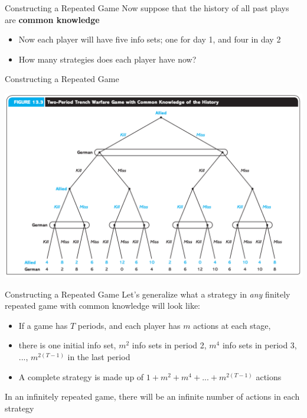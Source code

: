 \begin{frame}{Constructing a Repeated Game}
  Now suppose that the history of all past plays are \textbf{common knowledge} 
  \begin{itemize}
    \item Now each player will have five info sets; one for day 1, and four in day 2 
    \item How many strategies does each player have now?
  \end{itemize}
\end{frame}

\begin{frame}{Constructing a Repeated Game}
  \begin{center}
    \includegraphics[width=1\textwidth]{figures/fig133.png} 
  \end{center} 
\end{frame}

\begin{frame}{Constructing a Repeated Game}
  Let's generalize what a strategy in \textit{any} \alert{finitely repeated game} with \alert{common knowledge} will look like:
  \begin{itemize}
    \item If a game has $T$ periods, and each player has $m$ actions at each stage,
    \item there is one initial info set, $m^2$ info sets in period 2, $m^4$ info sets in period 3, ..., $m^{2(T-1)}$ in the last period 
    \item A complete strategy is made up of $1 + m^2 + m^4 + ... + m^{2(T-1)}$ actions 
  \end{itemize}
  In an \alert{infinitely repeated game}, there will be an infinite number of actions in each strategy
\end{frame}

